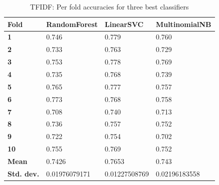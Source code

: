 \documentclass{article}
\begin{document}
\begin{table}[H]
\begin{tabular}{llll}
\textbf{Fold}      & \textbf{RandomForest} & \textbf{LinearSVC} & \textbf{MultinomialNB} \\ \hline
\textbf{1}         & 0.746                 & 0.779              & 0.760                  \\
\textbf{2}         & 0.733                 & 0.763              & 0.729                  \\
\textbf{3}         & 0.753                 & 0.778              & 0.769                  \\
\textbf{4}         & 0.735                 & 0.768              & 0.739                  \\
\textbf{5}         & 0.765                 & 0.777              & 0.757                  \\
\textbf{6}         & 0.773                 & 0.768              & 0.758                  \\
\textbf{7}         & 0.708                 & 0.740              & 0.713                  \\
\textbf{8}         & 0.736                 & 0.757              & 0.752                  \\
\textbf{9}         & 0.722                 & 0.754              & 0.702                  \\
\textbf{10}        & 0.755                 & 0.769              & 0.752                  \\ \hline
\textbf{Mean}      & 0.7426                & 0.7653             & 0.743                  \\ \hline
\textbf{Std. dev.} & 0.01976079171         & 0.01227508769      & 0.02196183558       
\end{tabular}
\caption {TFIDF: Per fold accuracies for three best classifiers}
\end{table}
\end{document}
